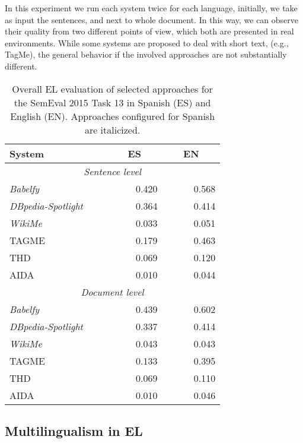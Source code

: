 \documentclass[sigconf]{acmart}
\begin{document}
In this experiment we run each system twice for each language, initially, we take as input the sentences, and next to whole document. In this way, we can observe their quality from two different points of view, which both are presented in real environments. While some systems are proposed to deal with short text, (e.g., TagMe), the general behavior if the involved approaches are not substantially different. 

\begin{table}[tb!]
\centering
\caption{Overall EL evaluation of selected approaches for the SemEval 2015 Task 13 in Spanish (ES) and English (EN). Approaches configured for Spanish are italicized.}
\label{tab:evaluateEL}
\begin{tabular}{lrr}
\toprule
\textbf{System} &~~~\textbf{ES}~~~&~~~\textbf{EN}~~~ \\ \midrule
\multicolumn{3}{c}{\textit{Sentence level}} \\ \midrule
\textit{Babelfy}          &0.420&0.568\\\midrule
\textit{DBpedia-Spotlight}&0.364&0.414\\\midrule
\textit{WikiMe}           &0.033&0.051\\\midrule
TAGME                     &0.179&0.463\\\midrule
THD                       &0.069&0.120\\\midrule
AIDA                      &0.010&0.044\\
\midrule
\multicolumn{3}{c}{\textit{Document level}} \\ \midrule
\textit{Babelfy}          &0.439&0.602\\\midrule
\textit{DBpedia-Spotlight}~~~~&0.337&0.414\\\midrule
\textit{WikiMe}           &0.043&0.043\\\midrule
TAGME                     &0.133&0.395\\\midrule
THD                       &0.069&0.110\\\midrule
AIDA                      &0.010&0.046\\
\bottomrule
\end{tabular}
\end{table}





\subsection{Multilingualism in EL}
\end{document}
